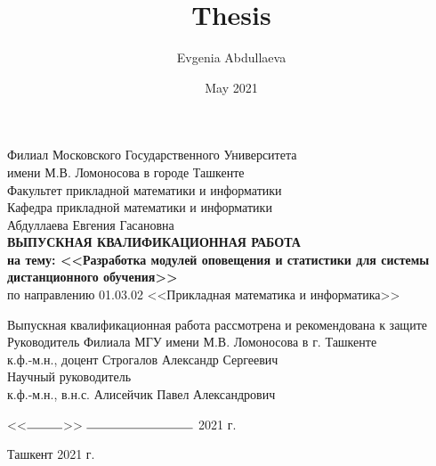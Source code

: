 \documentclass[14pt, a4paper, oneside]{extarticle}
\title{Thesis}
\author{Evgenia Abdullaeva}
\date{May 2021}
\begin{document}
\begin{titlepage}
    \begin{center}
        Филиал Московского Государственного Университета\\
        имени М.В. Ломоносова в городе Ташкенте\\
        \vspace{0.5cm}
        Факультет прикладной математики и информатики\\
        Кафедра прикладной математики и информатики\\
        \vfill
        Абдуллаева Евгения Гасановна\\
        \vfill
        \textbf{ВЫПУСКНАЯ КВАЛИФИКАЦИОННАЯ РАБОТА\\
        на тему: <<Разработка модулей оповещения и статистики для системы дистанционного обучения>>}\\
        \vspace{0.5cm}
        по направлению 01.03.02 <<Прикладная математика и информатика>>
    \end{center}
    \vfill
    \begin{flushleft}
        Выпускная квалификационная работа рассмотрена и рекомендована к защите\\
        \vspace{0.5cm}
        Руководитель Филиала МГУ имени М.В. Ломоносова в г. Ташкенте\\
        к.ф.-м.н., доцент Строгалов Александр Сергеевич\\
        \vspace{0.5cm}
        Научный руководитель\\
        к.ф.-м.н., в.н.с. Алисейчик Павел Александрович
    \end{flushleft}
    \vfill
    \begin{flushright}
        <<$\rule{1cm}{0.15mm}$>> $\rule{3cm}{0.15mm}$ 2021 г.
    \end{flushright}
    \vfill
    \begin{center}
        Ташкент 2021 г.
    \end{center}
\end{titlepage}
\end{document}
